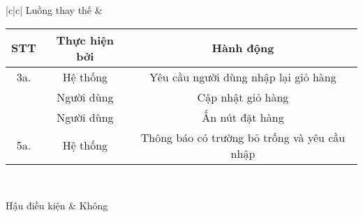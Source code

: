 \documentclass[]{report}
\begin{document}
\begin{table}
\begin{tabular}{|c|c|}
		Luồng thay thế 
		&	\begin{tabular}{|c|c|c|}
				\firsthline
				STT
				& Thực hiện bởi 
				& Hành động \\
				\hline 
			
				3a.
				& Hệ thống 
				& Yêu cầu người dùng nhập lại giỏ hàng \\
				\hline 
				& Người dùng 
				& Cập nhật giỏ hàng \\
				\hline
				& Người dùng 
				& Ấn nút đặt hàng \\
				\hline 
				\hline
				
				5a.
				& Hệ thống 
				& Thông báo có trường bỏ trống và yêu cầu nhập \\
				\hline
			\end{tabular} \\
			[15ex]
		\hline
		
		Hậu điều kiện 
		& Không 
		\\ \hline
		
	\end{tabular}
\end{table}
\end{document}
